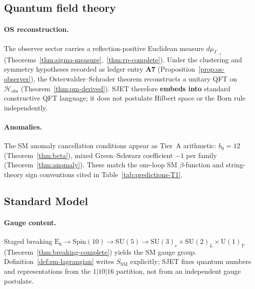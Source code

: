 \documentclass[aps,prd,onecolumn,amsmath,amssymb,nofootinbib,11pt]{revtex4-2}
\numberwithin{equation}{section}
\theoremstyle{plain}
\theoremstyle{definition}
\theoremstyle{remark}
\newcommand{\E}[1]{\mathrm{E}_{#1}}
\newcommand{\Spin}{\mathrm{Spin}}
\begin{document}
\subsection{Quantum field theory}
\label{sec:standard-theories:qft}

\paragraph{OS reconstruction.}
The observer sector carries a reflection-positive Euclidean measure
$d\mu_{\Gamma_{-1}}$ (Theorems~\ref{thm:sigma-measure},~\ref{thm:rp-complete}).
Under the clustering and symmetry hypotheses recorded as ledger entry
\textbf{A7} (Proposition~\ref{prop:os-observer}), the Osterwalder--Schrader theorem
\cite{OsterwalderSchrader1973} reconstructs a unitary QFT on
$\mathcal{H}_{\mathrm{obs}}$ (Theorem~\ref{thm:qm-derived}). SJET therefore
\textbf{embeds into} standard constructive QFT language; it does not postulate
Hilbert space or the Born rule independently.

\paragraph{Anomalies.}
The SM anomaly cancellation conditions appear as Tier~A arithmetic:
$b_0=12$ (Theorem~\ref{thm:beta}), mixed Green--Schwarz coefficient $-1$ per
family (Theorem~\ref{thm:anomaly}). These match the one-loop SM $\beta$-function
and string-theory sign conventions cited in Table~\ref{tab:predictions-T1}.

\subsection{Standard Model}
\label{sec:standard-theories:sm}

\paragraph{Gauge content.}
Staged breaking
$\E{6}\to\Spin(10)\to\mathrm{SU}(5)\to\mathrm{SU}(3)_c\times\mathrm{SU}(2)_L\times\mathrm{U}(1)_Y$
(Theorem~\ref{thm:breaking-complete}) yields the SM gauge group.
Definition~\ref{def:sm-lagrangian} writes $S_{\mathrm{SM}}$ explicitly;
SJET fixes quantum numbers and representations from the $1|10|16$ partition,
not from an independent gauge postulate.
\end{document}
